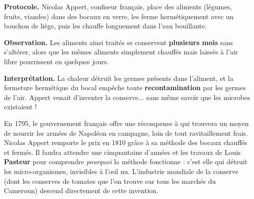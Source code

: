 \documentclass[11pt]{article}
\newcommand{\cle}[1]{{\popxbold\color{popdark}#1}}
\begin{document}
\begin{experience}
\textbf{Protocole.} Nicolas Appert, confiseur français, place des aliments (légumes, fruits, viandes) dans des bocaux en verre, les ferme hermétiquement avec un bouchon de liège, puis les chauffe longuement dans l'eau bouillante.

\textbf{Observation.} Les aliments ainsi traités se conservent \textbf{plusieurs mois} sans s'altérer, alors que les mêmes aliments simplement chauffés mais laissés à l'air libre pourrissent en quelques jours.

\textbf{Interprétation.} La chaleur détruit les germes présents dans l'aliment, et la fermeture hermétique du bocal empêche toute \textbf{recontamination} par les germes de l'air. Appert venait d'inventer la \cle{conserve}... sans même savoir que les microbes existaient !
\end{experience}

\begin{savaistu}
En 1795, le gouvernement français offre une récompense à qui trouvera un moyen de nourrir les armées de Napoléon en campagne, loin de tout ravitaillement frais. Nicolas Appert remporte le prix en 1810 grâce à sa méthode des bocaux chauffés et fermés. Il faudra attendre une cinquantaine d'années et les travaux de Louis \textbf{Pasteur} pour comprendre \emph{pourquoi} la méthode fonctionne : c'est elle qui détruit les micro-organismes, invisibles à l'œil nu. L'industrie mondiale de la conserve (dont les conserves de tomates que l'on trouve sur tous les marchés du Cameroun) descend directement de cette invention.
\end{savaistu}
\end{document}
